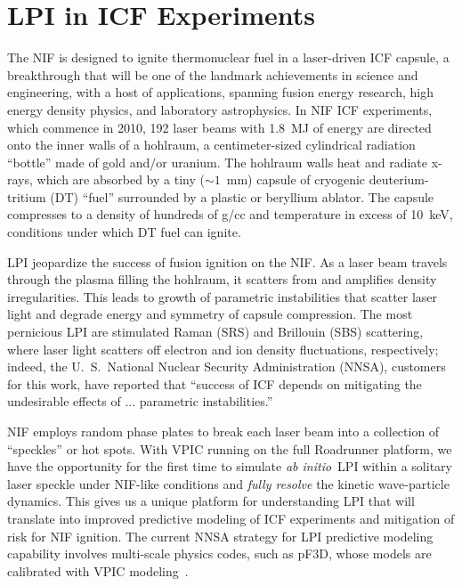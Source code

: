 \documentclass[journal,twoside]{IEEEtran}
\newcommand{\abinitio} {\textit{ab initio}}
\begin{document}
\section{LPI in ICF Experiments}

The NIF is designed to ignite thermonuclear fuel in a laser-driven ICF
capsule, a breakthrough that will be one of the landmark achievements
in science and engineering, with a host of applications, spanning
fusion energy research, high energy density physics, and laboratory
astrophysics.  In NIF ICF experiments, which commence in 2010, 192
laser beams with 1.8~MJ of energy are directed onto the inner walls of
a hohlraum, a centimeter-sized cylindrical radiation ``bottle'' made
of gold and/or uranium.  The hohlraum walls heat and radiate x-rays,
which are absorbed by a tiny ($\sim 1$~mm) capsule of cryogenic
deuterium-tritium (DT) ``fuel'' surrounded by a plastic or beryllium
ablator.  The capsule compresses to a density of hundreds of g/cc and
temperature in excess of 10~keV, conditions under which DT fuel can
ignite.

LPI jeopardize the success of fusion ignition on the NIF.  As a laser
beam travels through the plasma filling the hohlraum, it scatters from
and amplifies density irregularities.  This leads to growth of
parametric instabilities that scatter laser light and degrade energy
and symmetry of capsule compression.  The most pernicious LPI are
stimulated Raman (SRS) and Brillouin (SBS) scattering, where laser
light scatters off electron and ion density fluctuations,
respectively; indeed, the U.~S.~National Nuclear Security
Administration (NNSA), customers for this work, have reported that
``success of ICF depends on mitigating the undesirable effects of ...
parametric instabilities.''~\cite{LLNL_LPI_webpage}

NIF employs random phase plates to break each laser beam into a
collection of ``speckles'' or hot spots.  
With VPIC running on the full Roadrunner platform, we have the
opportunity for the first time to simulate \abinitio\ LPI within a
solitary laser speckle under NIF-like conditions and \textit{fully
resolve} the kinetic wave-particle dynamics.  This gives us a unique
platform for understanding LPI that will translate into improved
predictive modeling of ICF experiments and mitigation of risk for NIF
ignition.  The current NNSA strategy for LPI predictive modeling
capability involves multi-scale physics codes, such as pF3D, whose
models are calibrated with VPIC
modeling~\cite{Glenzer_Nature_Physics_2007,
Labaune_Nature_Physics_2007}.
\end{document}
